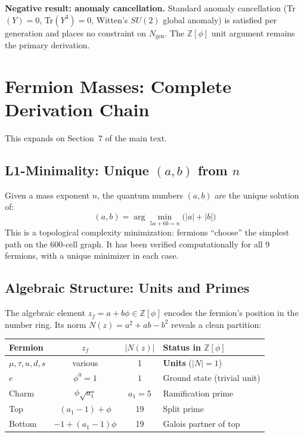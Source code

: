 \documentclass[12pt,a4paper]{article}
\theoremstyle{definition}
\begin{document}
\textbf{Negative result: anomaly cancellation.}  Standard anomaly cancellation (Tr$(Y) = 0$, Tr$(Y^3) = 0$, Witten's $SU(2)$ global anomaly) is satisfied per generation and places no constraint on $N_{\text{gen}}$.  The $\mathbb{Z}[\phi]$ unit argument remains the primary derivation.


\section{Fermion Masses: Complete Derivation Chain}
\label{sec:S-masses}

This expands on Section~7 of the main text.

\subsection{L1-Minimality: Unique \texorpdfstring{$(a,b)$}{(a,b)} from \texorpdfstring{$n$}{n}}

Given a mass exponent $n$, the quantum numbers $(a,b)$ are the unique solution of:
\begin{equation}
(a,b) = \arg\min_{5a + 6b = n} \bigl(|a| + |b|\bigr)
\end{equation}
This is a topological complexity minimization: fermions ``choose'' the simplest path on the 600-cell graph. It has been verified computationally for all 9 fermions, with a unique minimizer in each case.

\subsection{Algebraic Structure: Units and Primes}

The algebraic element $z_f = a + b\phi \in \mathbb{Z}[\phi]$ encodes the fermion's position in the number ring. Its norm $N(z) = a^2 + ab - b^2$ reveals a clean partition:

\begin{center}
\begin{tabular}{lccl}
\toprule
\textbf{Fermion} & $z_f$ & $|N(z)|$ & \textbf{Status in $\mathbb{Z}[\phi]$} \\
\midrule
$\mu, \tau, u, d, s$ & various & 1 & \textbf{Units} ($|N| = 1$) \\
$e$ & $\phi^0 = 1$ & $1$ & Ground state (trivial unit) \\
Charm & $\phi\sqrt{a_1}$ & $a_1 = 5$ & Ramification prime \\
Top & $(a_1-1) + \phi$ & 19 & Split prime \\
Bottom & $-1 + (a_1-1)\phi$ & 19 & Galois partner of top \\
\bottomrule
\end{tabular}
\end{center}
\end{document}

